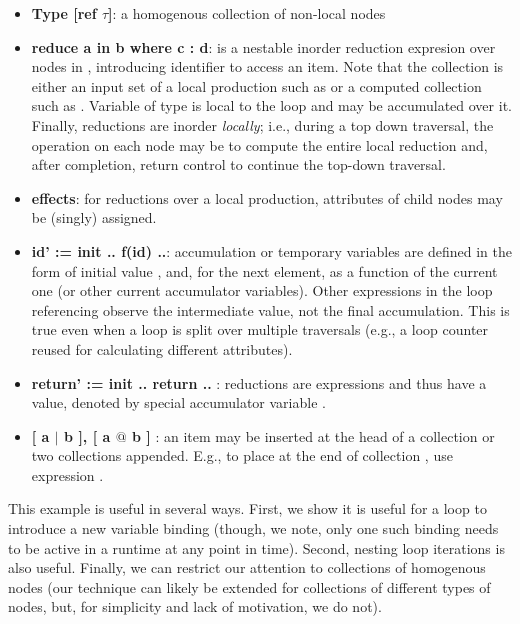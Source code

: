 \begin{itemize}
\item \textbf{Type [ref $\tau$]}: a homogenous collection of non-local nodes
\item \textbf{reduce a in b where c : d}: is a nestable inorder reduction expresion over nodes in , introducing identifier  to access an item. Note that the collection is either an input set of a local production such as  or a computed collection such as . Variable  of type  is local to the loop and may be accumulated over it. Finally, reductions are inorder \emph{locally}; i.e., during a top down traversal, the operation on each node may be to compute the entire local reduction and, after completion, return control to continue the top-down traversal.
\item \textbf{effects}: for reductions over a local production, attributes of child nodes may be (singly) assigned. 
\item \textbf{ id' := init .. f(id) ..}: accumulation or temporary variables are defined in the form of initial value , and, for the next element, as a function of the current one (or other current accumulator variables). Other expressions in the loop referencing  observe the intermediate value, not the final accumulation. This is true even when a loop is split over multiple traversals (e.g., a loop counter reused for calculating different attributes).
\item \textbf{ return' := init .. return .. }: reductions are expressions and thus have a value, denoted by special accumulator variable . 
\item \textbf{ [ a $|$ b ], [ a $@$ b ] }: an item may be inserted at the head of a collection or two collections appended. E.g., to place  at the end of collection , use expression \code{[b @ [a]]}.
\end{itemize}


This example is useful in several ways. First, we show it is useful for a loop to introduce a new variable binding (though, we note, only one such binding needs to be active in a runtime at any point in time). Second, nesting loop iterations is also useful. Finally, we can restrict our attention to collections of homogenous nodes (our technique can likely be extended for collections of different types of nodes, but, for simplicity and lack of motivation, we do not).

